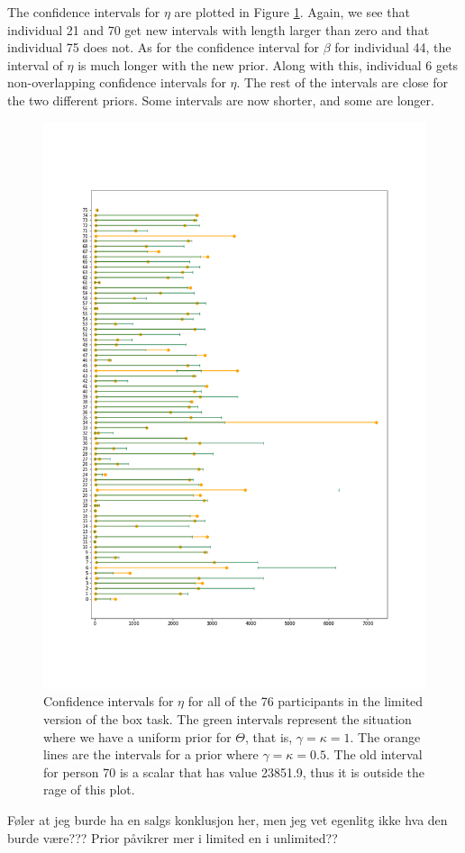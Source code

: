 The confidence intervals for $\eta$ are plotted in Figure \ref{fig:sensitivity_ci_lim_eta}. Again, we see that individual 21 and 70  get new intervals with length larger than zero and that individual 75 does not. As for the confidence interval for $\beta$ for individual 44, the interval of $\eta$ is much longer with the new prior. Along with this, individual 6 gets non-overlapping confidence intervals for $\eta$. The rest of the intervals are close for the two different priors. Some intervals are now shorter, and some are longer. 
\begin{figure}
    \centering
    \includegraphics[scale=0.37]{pictures/Sensitivity/ci_lim_eta_zoomed.png}
    \caption[CIs for $\eta$ for all participants with two different priors, limited]{Confidence intervals for $\eta$ for all of the 76 participants in the limited version of the box task. The green intervals represent the situation where we have a uniform prior for $\Theta$, that is, $\gamma=\kappa=1$. The orange lines are the intervals for a prior where $\gamma=\kappa=0.5$. The old interval for person 70 is a scalar that has value 23851.9, thus it is outside the rage of this plot.}
    \label{fig:sensitivity_ci_lim_eta}
\end{figure}


Føler at jeg burde ha en salgs konklusjon her, men jeg vet egenlitg ikke hva den burde være??? Prior påvikrer mer i limited en i unlimited??